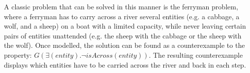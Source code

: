 A classic problem that can be solved in this manner is the ferryman problem, where a ferryman has to carry across a river several entities (e.g. a cabbage, a wolf, and a sheep) on a boat with a limited capacity, while never leaving certain pairs of entities unattended (e.g. the sheep with the cabbage or the sheep with the wolf).
Once modelled, the solution can be found as a counterexample to the property:
\begin{math}
    G (\exists (entity). \lnot isAcross(entity))
\end{math}.
The resulting counterexample displays which entities have to be carried across the river and back in each step.


